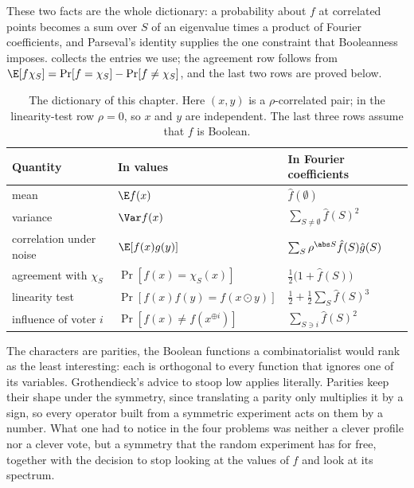 \begin{refsection}
These two facts are the whole dictionary: a probability about $f$ at correlated points becomes a sum over $S$ of an eigenvalue times a product of Fourier coefficients, and Parseval's identity supplies the one constraint that Booleanness imposes.  collects the entries we use; the agreement row follows from $\E[f\chi_S]=\Pr[f=\chi_S]-\Pr[f\ne\chi_S]$, and the last two rows are proved below.

\begin{table}[b]
\centering\small
\caption{The dictionary of this chapter. Here $(x,y)$ is a $\rho$-correlated pair; in the linearity-test row $\rho=0$, so $x$ and $y$ are independent. The last three rows assume that $f$ is Boolean.}
\label{tab:fourier:dictionary}
\begin{tabular}{@{}lll@{}}
\toprule
Quantity & In values & In Fourier coefficients\\
\midrule
mean & $\E f(x)$ & $\hat f(\emptyset)$\\
variance & $\Var f(x)$ & $\sum_{S\ne\emptyset}\hat f(S)^2$\\
correlation under noise & $\E[f(x)g(y)]$ & $\sum_S\rho^{\abs S}\hat f(S)\hat g(S)$\\
agreement with $\chi_S$ & $\Pr[f(x)=\chi_S(x)]$ & $\frac12\bigl(1+\hat f(S)\bigr)$\\
linearity test & $\Pr[f(x)f(y)=f(x\odot y)]$ & $\frac12+\frac12\sum_S\hat f(S)^3$\\
influence of voter $i$ & $\Pr[f(x)\ne f(x^{\oplus i})]$ & $\sum_{S\ni i}\hat f(S)^2$\\
\bottomrule
\end{tabular}
\end{table}

The characters are parities, the Boolean functions a combinatorialist would rank as the least interesting: each is orthogonal to every function that ignores one of its variables. Grothendieck's advice to stoop low applies literally. Parities keep their shape under the symmetry, since translating a parity only multiplies it by a sign, so every operator built from a symmetric experiment acts on them by a number. What one had to notice in the four problems was neither a clever profile nor a clever vote, but a symmetry that the random experiment has for free, together with the decision to stop looking at the values of $f$ and look at its spectrum.


\end{refsection}
